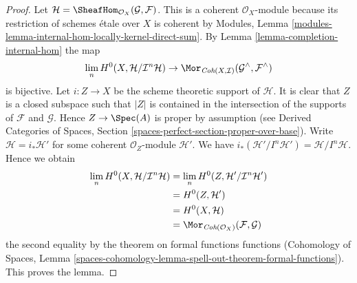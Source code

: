 \begin{proof}
Let $\mathcal{H} = \SheafHom_{\mathcal{O}_X}(\mathcal{G}, \mathcal{F})$.
This is a coherent $\mathcal{O}_X$-module because its restriction
of schemes \'etale over $X$ is coherent by
Modules, Lemma \ref{modules-lemma-internal-hom-locally-kernel-direct-sum}.
By Lemma \ref{lemma-completion-internal-hom} the map
$$
\lim_n H^0(X, \mathcal{H}/\mathcal{I}^n\mathcal{H})
\to
\Mor_{\textit{Coh}(X, \mathcal{I})}
(\mathcal{G}^\wedge, \mathcal{F}^\wedge)
$$
is bijective. Let $i : Z \to X$ be the scheme theoretic support of
$\mathcal{H}$. It is clear that $Z$ is a closed subspace such
that $|Z|$ is contained in the intersection of the supports of $\mathcal{F}$
and $\mathcal{G}$. Hence $Z \to \Spec(A)$ is proper by assumption
(see Derived Categories of Spaces, Section
\ref{spaces-perfect-section-proper-over-base}).
Write $\mathcal{H} = i_*\mathcal{H}'$ for some coherent
$\mathcal{O}_Z$-module $\mathcal{H}'$. We have
$i_*(\mathcal{H}'/I^n\mathcal{H}') = \mathcal{H}/I^n\mathcal{H}$.
Hence we obtain
\begin{align*}
\lim_n H^0(X, \mathcal{H}/\mathcal{I}^n\mathcal{H})
& =
\lim_n H^0(Z, \mathcal{H}'/\mathcal{I}^n\mathcal{H}') \\
& =
H^0(Z, \mathcal{H}') \\
& =
H^0(X, \mathcal{H}) \\
& = 
\Mor_{\textit{Coh}(\mathcal{O}_X)}(\mathcal{F}, \mathcal{G})
\end{align*}
the second equality by the theorem on formal functions
functions
(Cohomology of Spaces, Lemma
\ref{spaces-cohomology-lemma-spell-out-theorem-formal-functions}).
This proves the lemma.
\end{proof}

